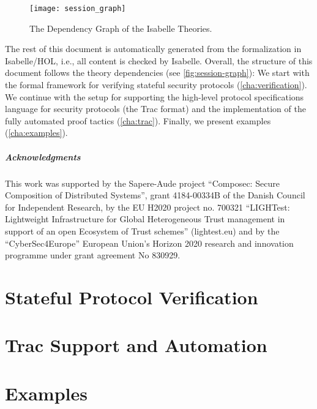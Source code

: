 \documentclass[10pt,DIV16,a4paper,abstract=true,twoside=semi,openright]
{scrreprt}
\begin{document}
  \begin{figure}
    \centering
    \texttt{[image: session\_graph]}
    \caption{The Dependency Graph of the Isabelle Theories.\label{fig:session-graph}}
  \end{figure}
  The rest of this document is automatically generated from the
  formalization in Isabelle/HOL, i.e., all content is checked by
  Isabelle.  Overall, the structure of this document follows the
  theory dependencies (see \autoref{fig:session-graph}): We start with
  the formal framework for verifying stateful security protocols
  (\autoref{cha:verification}). We continue with the setup for
  supporting the high-level protocol specifications language for
  security protocols (the Trac format) and the implementation of the
  fully automated proof tactics (\autoref{cha:trac}). Finally, we
  present examples (\autoref{cha:examples}).

\paragraph{Acknowledgments}
This work was supported by the Sapere-Aude project ``Composec: Secure Composition of Distributed Systems'', grant 4184-00334B of the Danish Council for Independent Research, by the EU H2020 project no. 700321 ``LIGHTest: Lightweight Infrastructure for Global Heterogeneous Trust management in support of an open Ecosystem of Trust schemes'' (lightest.eu) and by the ``CyberSec4Europe'' European Union's Horizon 2020 research and innovation programme under grant agreement No 830929.

\clearpage

\chapter{Stateful Protocol Verification}
\label{cha:verification}







\chapter{Trac Support and Automation}
\label{cha:trac}







\chapter{Examples}
\label{cha:examples}







% 


{\small
  
  
}
\end{document}
